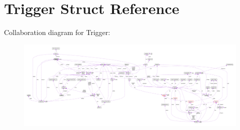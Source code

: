\hypertarget{struct_trigger}{\section{Trigger Struct Reference}
\label{struct_trigger}
}


Collaboration diagram for Trigger\-:\nopagebreak
\begin{figure}[H]
\begin{center}
\leavevmode
\includegraphics[width=350pt]{struct_trigger__coll__graph}
\end{center}
\end{figure}
